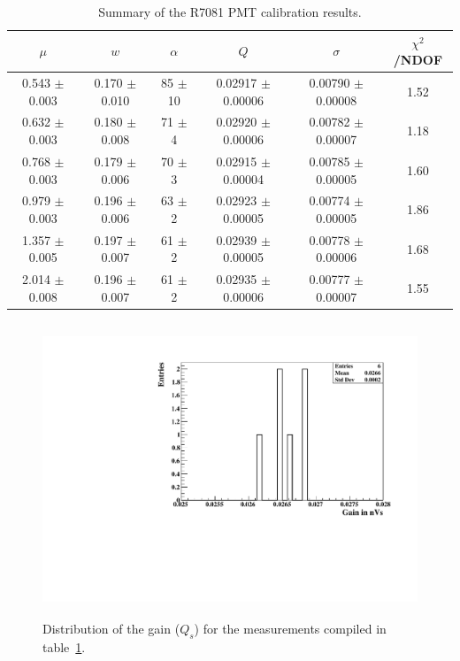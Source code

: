 \documentclass[a4paper,11pt]{article}
\begin{document}
\begin{table}[t!]
\centering
\begin{tabular}{| c  || c | c | c | c || c |}
\hline
$\mu$                      & $w$                         &  $\alpha$         &  $Q$                               &  $\sigma$ & $\chi^2$/NDOF\\[0.6ex] \hline\hline
0.543 $\pm$ 0.003  & 0.170 $\pm$ 0.010  &  85 $\pm$ 10  & 0.02917 $\pm$ 0.00006 &  0.00790 $\pm$ 0.00008 & 1.52 \\
0.632 $\pm$ 0.003  & 0.180 $\pm$ 0.008  &  71 $\pm$   4  & 0.02920 $\pm$ 0.00006 &  0.00782 $\pm$ 0.00007 & 1.18 \\
0.768 $\pm$ 0.003  & 0.179 $\pm$ 0.006  &  70 $\pm$   3  & 0.02915 $\pm$ 0.00004 &  0.00785 $\pm$ 0.00005 & 1.60 \\
0.979 $\pm$ 0.003  & 0.196 $\pm$ 0.006  &  63 $\pm$   2  & 0.02923 $\pm$ 0.00005 &  0.00774 $\pm$ 0.00005 & 1.86 \\
1.357 $\pm$ 0.005  & 0.197 $\pm$ 0.007  &  61 $\pm$   2  & 0.02939 $\pm$ 0.00005 &  0.00778 $\pm$ 0.00006 & 1.68 \\
2.014 $\pm$ 0.008  & 0.196 $\pm$ 0.007  &  61 $\pm$   2  & 0.02935 $\pm$ 0.00006 &  0.00777 $\pm$ 0.00007 & 1.55
\\[0.6ex] \hline\hline
\end{tabular}
\caption{Summary of the R7081 PMT calibration results.}
\label{tab:money}
\end{table}

\begin{figure}[!t]
\centering
\includegraphics[width=12.2cm, height=8.8cm]{figures/G.pdf} 
\caption{Distribution of the gain ($Q_s$) for the measurements compiled in table~\ref{tab:money}. }
\label{fig:g}
\end{figure}
\end{document}

